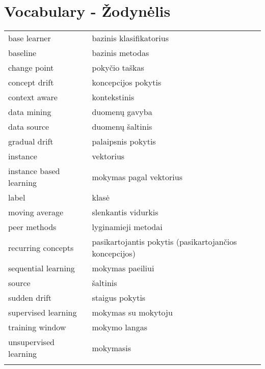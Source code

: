 \chapter*{Vocabulary - \v{Z}odyn\.elis}
\label{cha:vocabulary}

\noindent
 \begin{longtable}[l]{ p{4cm} p{7cm} } %
    base learner   &  bazinis klasifikatorius \\
    baseline       &  bazinis metodas \\
    change point   &  poky\v{c}io ta\v{s}kas  \\
    concept drift  &  koncepcijos pokytis \\
    context aware  &  kontekstinis  \\
    data mining    &  duomen\k{u} gavyba \\ 
    data source    &  duomen\k{u} \v{s}altinis \\
    gradual drift  &  palaipsnis pokytis  \\
    instance       &  vektorius \\
    instance based learning &  mokymas pagal vektorius \\ 
    label          &  klas\.e \\
    moving average &  slenkantis vidurkis \\ 
    peer methods   &  lyginamieji metodai  \\
    recurring concepts  &  pasikartojantis pokytis (pasikartojan\v{c}ios koncepcijos)  \\
    sequential learning &  mokymas paeiliui  \\
    source         &  \v{s}altinis  \\
    sudden drift   &  staigus pokytis  \\
    supervised learning   &  mokymas su mokytoju  \\
    training window       &  mokymo langas  \\
    unsupervised learning &  mokymasis  \\
    \label{tab:vocabulary}
\end{longtable}


